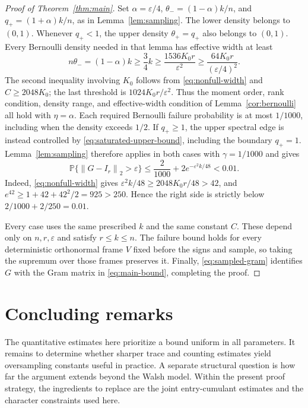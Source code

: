 \documentclass[11pt]{article}
\theoremstyle{definition}
\theoremstyle{remark}
\theoremstyle{plain}
\newcommand{\Prob}{\mathbb P}
\newcommand{\norm}[1]{\left\lVert#1\right\rVert_2}
\begin{document}
\begin{proof}[Proof of Theorem~\ref{thm:main}]
Set $\alpha=\varepsilon/4$, $\theta_-=(1-\alpha)k/n$, and
$q_+=(1+\alpha)k/n$, as in Lemma~\ref{lem:sampling}.
The lower density belongs to $(0,1)$. Whenever $q_+<1$, the
upper density $\theta_+=q_+$ also belongs to $(0,1)$.
Every Bernoulli density needed in that lemma has effective width at least
\begin{equation}\label{eq:bernoulli-widths}
 n\theta_-=(1-\alpha)k\ge\frac34 k
 \ge\frac{1536K_0r}{\varepsilon^2}
 \ge\frac{64K_0r}{(\varepsilon/4)^2}.
\end{equation}
The second inequality involving $K_0$ follows from
\eqref{eq:nonfull-width} and $C\ge2048K_0$; the last threshold is
$1024K_0r/\varepsilon^2$. Thus the moment order, rank condition,
density range, and effective-width condition of
Lemma~\ref{cor:bernoulli} all hold with $\eta=\alpha$.
Each required Bernoulli failure probability is at most $1/1000$,
including when the density exceeds $1/2$.
If $q_+\ge1$, the upper spectral edge is instead controlled by
\eqref{eq:saturated-upper-bound}, including the boundary $q_+=1$.
Lemma~\ref{lem:sampling} therefore applies in both cases with
$\gamma=1/1000$ and gives
\begin{equation}\label{eq:final-failure}
 \Prob\{\norm{G-I_r}>\varepsilon\}
 \le\frac2{1000}+2e^{-\varepsilon^2k/48}<0.01.
\end{equation}
Indeed, \eqref{eq:nonfull-width} gives
$\varepsilon^2k/48\ge2048K_0r/48>42$, and
$e^{42}\ge1+42+42^2/2=925>250$. Hence the right side is strictly
below $2/1000+2/250=0.01$.

Every case uses the same prescribed $k$ and the same constant $C$.
These depend only on $n,r,\varepsilon$ and satisfy $r\le k\le n$.
The failure bound holds for every deterministic orthonormal frame $V$
fixed before the signs and sample, so taking the supremum over those
frames preserves it. Finally, \eqref{eq:sampled-gram} identifies
$G$ with the Gram matrix in \eqref{eq:main-bound}, completing the proof.
\end{proof}

\section{Concluding remarks}\label{sec:conclusion}

The quantitative estimates here prioritize a bound uniform in all
parameters. It remains to determine whether sharper trace and counting
estimates yield oversampling constants useful in practice. A separate
structural question is how far the argument extends beyond the Walsh
model. Within the present proof strategy, the ingredients to replace
are the joint entry-cumulant estimates and the character constraints
used here.
\end{document}
